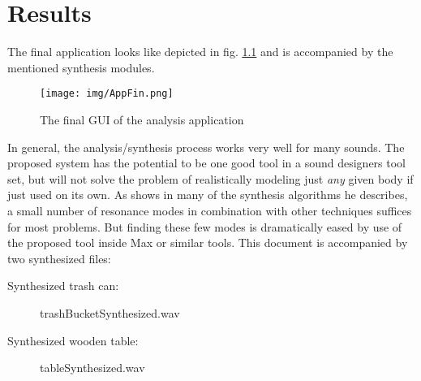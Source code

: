 \chapter{Results}
\label{results}
The final application looks like depicted in fig. \ref{fig:app} and is accompanied by the mentioned synthesis modules.

\begin{figure}[h]
	\begin{center}
		\texttt{[image: img/AppFin.png]}
		\caption{The final GUI of the analysis application}
		\label{fig:app}
	\end{center}
\end{figure}

In general, the analysis/synthesis process works very well for many sounds. The proposed system has the potential to be one good tool in a sound designers tool set, but will not solve the problem of realistically modeling just \textit{any} given body if just used on its own. As \citep{farnell_designing_2010} shows in many of the synthesis algorithms he describes, a small number of resonance modes in combination with other techniques suffices for most problems. But finding these few modes is dramatically eased by use of the proposed tool inside Max or similar tools. 
This document is accompanied by two synthesized files:
\begin{description}
	\item [Synthesized trash can:] trashBucketSynthesized.wav
	\item [Synthesized wooden table:] tableSynthesized.wav
\end{description}

